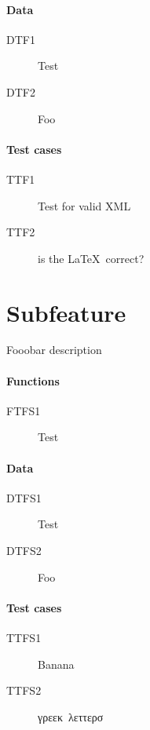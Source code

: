 \documentclass[a4paper, 11pt, pdftex, fleqn, review]{article}
\begin{document}
		\paragraph{Data}
		\begin{description}
		
			\item[DTF1] Test
			\item[DTF2] Foo
		\end{description}

		\paragraph{Test cases}
		\begin{description}
		
			\item[TTF1] Test for valid XML
			\item[TTF2] is the \LaTeX correct?
		\end{description}

		
		\section{Subfeature}

		Fooobar description

		\paragraph{Functions}
		\begin{description}
		
			\item[FTFS1] Test
		\end{description}

		\paragraph{Data}
		\begin{description}
		
			\item[DTFS1] Test
			\item[DTFS2] Foo
		\end{description}

		\paragraph{Test cases}
		\begin{description}
		
			\item[TTFS1] Banana
			\item[TTFS2] γρεεκ λεττερσ
		\end{description}
\end{document}
